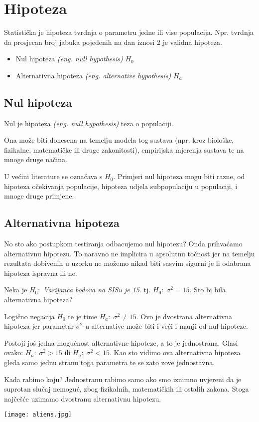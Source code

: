\chapter{Hipoteza}

Statistička je hipoteza tvrdnja o parametru jedne ili vise populacija.\cite{matstat} Npr. tvrdnja da prosjecan broj jabuka pojedenih na dan iznosi 2 je validna hipoteza.

\begin{itemize}
\item Nul hipoteza \textit{(eng. null hypothesis)} $H_0$
\item Alternativna hipoteza \textit{(eng. alternative hypothesis)} $H_a$
\end{itemize}

\section{Nul hipoteza}

Nul je hipoteza \textit{(eng. null hypothesis)} teza o populaciji.

Ona može biti donesena na temelju modela tog sustava (npr. kroz biološke, fizikalne, matematičke ili druge zakonitosti), empirijska mjerenja sustava te na mnoge druge načina. 

U većini literature \cite{matstat}\cite{vis3} se označava s $H_0$. Primjeri nul hipoteza mogu biti razne, od hipoteza očekivanja populacije, hipoteza udjela subpopulaciju u populaciji, i mnoge druge primjene.

\section{Alternativna hipoteza}

No sto ako postupkom testiranja odbacujemo nul hipotezu? Onda prihvaćamo alternativnu hipotezu. To naravno ne implicira u apsolutnu točnost jer na temelju rezultata dobivenih u uzorku ne možemo nikad biti sasvim sigurni je li odabrana
hipoteza ispravna ili ne. \cite{vis3}

Neka je $H_0:$ \emph{Varijanca bodova na SISu je 15}. tj. $H_0:\; \sigma^2 = 15$. Sto bi bila alternativna hipoteza? 

Logično negacija $H_0$ te je time $H_a:\; \sigma^2 \ne 15$. Ovo je dvostrana alternativna hipoteza jer parametar $\sigma^2$ u alternative može biti i veći i manji od nul hipoteze. 

Postoji još jedna mogućnost alternativne hipoteze, a to je jednostrana. Glasi ovako: $H_a:\; \sigma^2 > 15$ ili $H_a:\; \sigma^2 < 15$. Kao sto vidimo ova alternativna hipoteza gleda samo jednu stranu toga parametra te se zato zove jednostavna. \cite{engstat}

Kada rabimo koju? Jednostranu rabimo samo ako smo iznimno uvjereni da je suprotan slučaj nemoguć, zbog fizikalnih, matematičkih ili ostalih zakona. Stoga najčešće uzimamo dvostranu alternativnu hipotezu.

\texttt{[image: aliens.jpg]}